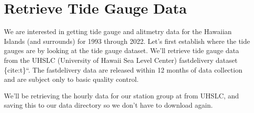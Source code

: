 \documentclass[letterpaper,10pt,english]{jupyterBook}
\begin{document}
\chapter{Retrieve Tide Gauge Data}
\label{\detokenize{notebooks/SL_Data_Wrangling:retrieve-tide-gauge-data}}
\sphinxAtStartPar
We are interested in getting tide gauge and alitmetry data for the Hawaiian Islands (and surrounds) for 1993 through 2022.
Let’s first establish where the tide gauges are by looking at the tide gauge dataset. We’ll retrieve tide gauge data from the UHSLC (University of Hawaii Sea Level Center) fast\sphinxhyphen{}delivery dataset \{cite:t\}``. The fast\sphinxhyphen{}delivery data are released within 1\sphinxhyphen{}2 months of data collection and are subject only to basic quality control.

\sphinxAtStartPar
We’ll be retrieving the hourly data for our station group at from UHSLC, and saving this to our data directory so we don’t have to download again.
\end{document}
